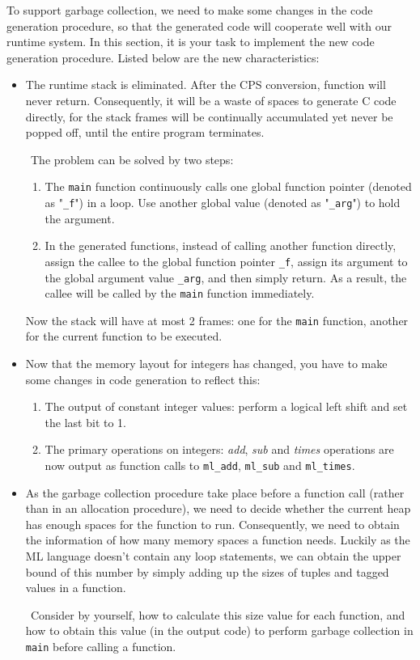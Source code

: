 \documentclass{article}
\theoremstyle{definition}
\theoremstyle{remark}
\numberwithin{equation}{section}
\begin{document}
To support garbage collection, we need to make some changes in the code
generation procedure, so that the generated code will cooperate well
with our runtime system. In this section, it is your task to implement the
new code generation procedure. Listed below are the new characteristics:
\begin{itemize}
  \item The runtime stack is eliminated. After the CPS conversion, function
  will never return. Consequently, it will be a waste of spaces to generate
  C code directly, for the stack frames will be continually accumulated
  yet never be popped off, until the entire program terminates.

  $\ \ $The problem can be solved by two steps:
  \begin{enumerate}
    \item The \texttt{main} function continuously calls one global function pointer
    (denoted as "\texttt{\_f}") in a loop. Use another global value (denoted as
    "\texttt{\_arg}") to hold the argument.
    \item In the generated functions, instead of calling another function directly,
    assign the callee to the global function pointer \texttt{\_f}, assign its
    argument to the global argument value \texttt{\_arg}, and then simply return.
    As a result, the callee will be called by the \texttt{main} function immediately.
  \end{enumerate}
    Now the stack will have at most 2 frames: one for the \texttt{main}
    function, another for the current function to be executed.
  \item Now that the memory layout for integers has changed, you have to make some changes
  in code generation to reflect this:
  \begin{enumerate}
    \item The output of constant integer values: perform a logical left shift and set
    the last bit to 1.
    \item The primary operations on integers: \textit{add}, \emph{sub} and \emph{times}
    operations are now output as function calls to \texttt{ml\_add}, \texttt{ml\_sub} and
     \texttt{ml\_times}.
  \end{enumerate}
  \item As the garbage collection procedure take place before a function call (rather than
  in an allocation procedure), we need to decide whether the current heap has enough spaces
  for the function to run. Consequently, we need to obtain the information of how many
  memory spaces a function needs. Luckily as the ML language doesn't contain
  any loop statements, we can obtain the upper bound of this number by simply adding up the
  sizes of tuples and tagged values in a function.

  $\ \ $Consider by yourself, how to calculate this size value for each function, and how
  to obtain this value
  (in the output code) to perform garbage collection in \texttt{main}  before
   calling a function.
\end{itemize}
\end{document}
